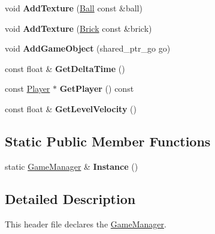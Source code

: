 \begin{DoxyCompactItemize}
\item 
\hypertarget{class_game_manager_a485bd810f6dc2ef7455c9e9aca5985f0}{}void {\bfseries Add\+Texture} (\hyperlink{class_ball}{Ball} const \&ball)\label{class_game_manager_a485bd810f6dc2ef7455c9e9aca5985f0}

\item 
\hypertarget{class_game_manager_a2020a9d4245d71a8eee76c23a5b960b8}{}void {\bfseries Add\+Texture} (\hyperlink{class_brick}{Brick} const \&brick)\label{class_game_manager_a2020a9d4245d71a8eee76c23a5b960b8}

\item 
\hypertarget{class_game_manager_ab15b413c02be2d539498855e06dcb864}{}void {\bfseries Add\+Game\+Object} (shared\+\_\+ptr\+\_\+go go)\label{class_game_manager_ab15b413c02be2d539498855e06dcb864}

\item 
\hypertarget{class_game_manager_af31c9c2e714cec2d051cb2fe4a3aaa65}{}const float \& {\bfseries Get\+Delta\+Time} ()\label{class_game_manager_af31c9c2e714cec2d051cb2fe4a3aaa65}

\item 
\hypertarget{class_game_manager_a1f75ae691ad6f83e21e0d64d646d70ee}{}const \hyperlink{class_player}{Player} $\ast$ {\bfseries Get\+Player} () const \label{class_game_manager_a1f75ae691ad6f83e21e0d64d646d70ee}

\item 
\hypertarget{class_game_manager_ac2faf63d961add72a37e011fca491602}{}const float \& {\bfseries Get\+Level\+Velocity} ()\label{class_game_manager_ac2faf63d961add72a37e011fca491602}

\end{DoxyCompactItemize}
\subsection*{Static Public Member Functions}
\begin{DoxyCompactItemize}
\item 
\hypertarget{class_game_manager_a137f3d22762082713a43057ced7937f0}{}static \hyperlink{class_game_manager}{Game\+Manager} \& {\bfseries Instance} ()\label{class_game_manager_a137f3d22762082713a43057ced7937f0}

\end{DoxyCompactItemize}


\subsection{Detailed Description}
This header file declares the \hyperlink{class_game_manager}{Game\+Manager}. 

